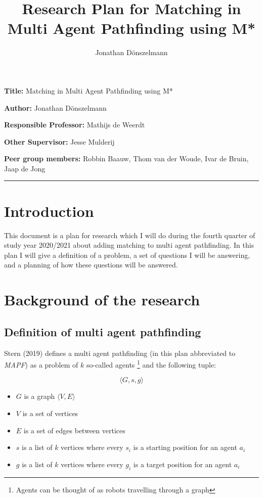 \documentclass[english]{article}
\title{Research Plan for Matching in Multi Agent Pathfinding using M*}
\author{Jonathan Dönszelmann}
\newcommand{\namelistlabel}[1]{\mbox{#1}\hfil}
\newenvironment{namelist}[1]{%
\begin{list}{}
    {
        \let\makelabel\namelistlabel
        \settowidth{\labelwidth}{#1}
        \setlength{\leftmargin}{1.1\labelwidth}
    }
  }{
\end{list}}
\begin{document}
\maketitle

\begin{namelist}{xxxxxxxxxxxxxxxxxxxxxxxxxxxxxxxxxxxxxxx}
\item[{\bf Title:}]
	Matching in Multi Agent Pathfinding using M*
\item[{\bf Author:}]
	Jonathan Dönszelmann
\item[{\bf Responsible Professor:}]
	Mathijs de Weerdt
\item[{\bf Other Supervisor:}]
	Jesse Mulderij
\item[{\bf Peer group members:}]
	Robbin Baauw, Thom van der Woude, Ivar de Bruin, Jaap de Jong
\end{namelist}

\tableofcontents
\noindent\rule{\textwidth}{1pt}

\section*{Introduction}

This document is a plan for research which I will do during the fourth quarter of study year 2020/2021 about adding matching to multi agent pathfinding. In this plan I will give a definition of a problem, a set of questions I will be answering, and a planning of how these questions will be answered.

\section{Background of the research}

\subsection{Definition of multi agent pathfinding}
Stern (2019) \cite{mapf_definition_stern_2019} defines a multi agent pathfinding (in this plan abbreviated to \textit{MAPF}) as a problem of $k$ so-called agents \footnote{Agents can be thought of as robots travelling through a graph} and the following tuple:

$$
\langle G, s, g \rangle
$$

\begin{itemize}
    \item $G$ is a graph $\langle V, E \rangle$
    \item $V$ is a set of vertices
    \item $E$ is a set of edges between vertices
    \item $s$ is a list of $k$ vertices where every $s_i$ is a starting position for an agent $a_i$
    \item $g$ is a list of $k$ vertices where every $g_i$ is a target position for an agent $a_i$
\end{itemize}
\end{document}
